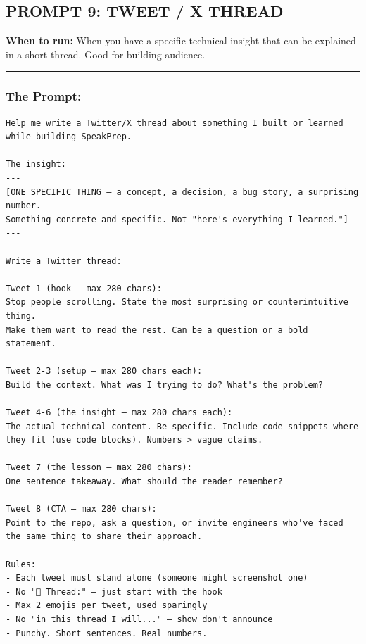 \documentclass[
  11pt,
]{article}
\begin{document}
\hypertarget{prompt-9-tweet-x-thread}{%
\subsection{PROMPT 9: TWEET / X THREAD}\label{prompt-9-tweet-x-thread}}

\textbf{When to run:} When you have a specific technical insight that
can be explained in a short thread. Good for building audience.

\begin{center}\rule{0.5\linewidth}{0.5pt}\end{center}

\hypertarget{the-prompt-8}{%
\subsubsection{The Prompt:}\label{the-prompt-8}}

\begin{lstlisting}
Help me write a Twitter/X thread about something I built or learned
while building SpeakPrep.

The insight:
---
[ONE SPECIFIC THING — a concept, a decision, a bug story, a surprising number.
Something concrete and specific. Not "here's everything I learned."]
---

Write a Twitter thread:

Tweet 1 (hook — max 280 chars):
Stop people scrolling. State the most surprising or counterintuitive thing.
Make them want to read the rest. Can be a question or a bold statement.

Tweet 2-3 (setup — max 280 chars each):
Build the context. What was I trying to do? What's the problem?

Tweet 4-6 (the insight — max 280 chars each):
The actual technical content. Be specific. Include code snippets where
they fit (use code blocks). Numbers > vague claims.

Tweet 7 (the lesson — max 280 chars):
One sentence takeaway. What should the reader remember?

Tweet 8 (CTA — max 280 chars):
Point to the repo, ask a question, or invite engineers who've faced
the same thing to share their approach.

Rules:
- Each tweet must stand alone (someone might screenshot one)
- No "🧵 Thread:" — just start with the hook
- Max 2 emojis per tweet, used sparingly
- No "in this thread I will..." — show don't announce
- Punchy. Short sentences. Real numbers.
\end{lstlisting}
\end{document}
